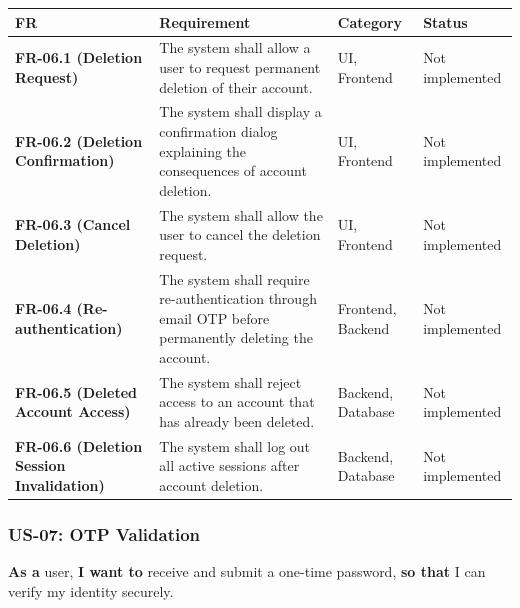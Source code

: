 \documentclass[12pt]{article}
\renewcommand{\baselinestretch}{1.5}
\begin{document}
\begingroup
\small
\renewcommand{\baselinestretch}{1.0}\selectfont
\renewcommand{\arraystretch}{1.15}
\setlength{\tabcolsep}{6pt}
\begin{longtable}{|>{\raggedright\arraybackslash}p{}|>{\raggedright\arraybackslash}p{}|>{\raggedright\arraybackslash}p{}|>{\raggedright\arraybackslash}p{}|}
\hline
\textbf{FR} & \textbf{Requirement} & \textbf{Category} & \textbf{Status} \\ \hline
\endhead
\textbf{FR-06.1 (Deletion Request)} & The system shall allow a user to request permanent deletion of their account. & UI, Frontend & Not implemented \\ \hline
\textbf{FR-06.2 (Deletion Confirmation)} & The system shall display a confirmation dialog explaining the consequences of account deletion. & UI, Frontend & Not implemented \\ \hline
\textbf{FR-06.3 (Cancel Deletion)} & The system shall allow the user to cancel the deletion request. & UI, Frontend & Not implemented \\ \hline
\textbf{FR-06.4 (Re-authentication)} & The system shall require re-authentication through email OTP before permanently deleting the account. & Frontend, Backend & Not implemented \\ \hline
\textbf{FR-06.5 (Deleted Account Access)} & The system shall reject access to an account that has already been deleted. & Backend, Database & Not implemented \\ \hline
\textbf{FR-06.6 (Deletion Session Invalidation)} & The system shall log out all active sessions after account deletion. & Backend, Database & Not implemented \\ \hline
\end{longtable}
\endgroup
\par\medskip

\hypertarget{sec:us-07-otp-validation}{}
\subsubsection*{US-07: OTP Validation}
\par\medskip

\textbf{As a} user, \textbf{I want to} receive and submit a one-time password, \textbf{so that} I can verify my identity securely.
\par\medskip
\end{document}
